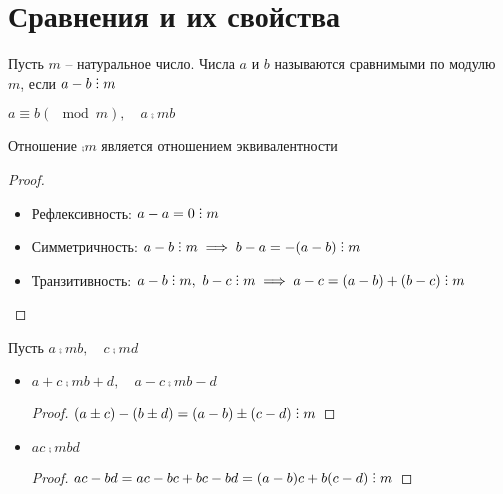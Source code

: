 \section{Сравнения и их свойства}

\begin{definition}
	Пусть $m$ -- натуральное число. Числа $a$ и $b$ называются сравнимыми по модулю $m$, если $a - b \divby m$
	\begin{notation}
		$ a \equiv b (\mod m), \quad a \comp{m} b $
	\end{notation}
\end{definition}

\begin{theorem}
	Отношение $\comp{m}$ является отношением эквивалентности
\end{theorem}

\begin{proof}
	\hfill
	\begin{itemize}
		\item Рефлексивность: $a - a = 0 \divby m$
		\item Симметричность: $a - b \divby m \implies b - a = -(a - b) \divby m $
		\item Транзитивность: $a - b \divby m, ~ b - c \divby m \implies a - c = (a - b) + (b - c) \divby m $
	\end{itemize}
\end{proof}

\begin{properties}
	Пусть $a \comp{m} b, \quad c \comp{m} d $
	\begin{itemize}
		\item $ a + c \comp{m} b + d, \quad a - c \comp{m} b - d $
		\begin{proof}
			$ (a \pm c) - (b \pm d) = (a - b) \pm (c - d) \divby m $
		\end{proof}
		\item $ ac \comp{m} bd $
		\begin{proof}
			$ ac - bd = ac - bc + bc - bd = (a - b)c + b(c - d) \divby m $
		\end{proof}
	\end{itemize}
\end{properties}

